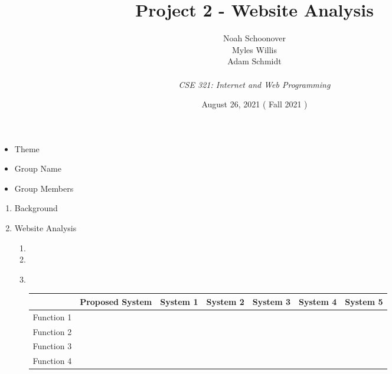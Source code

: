 \documentclass[12pt]{article}%
\def\assignmentName { Project 2 - Website Analysis                      }
\def\className      { CSE 321: Internet and Web Programming             }
\def\studentName    { Noah Schoonover \\ Myles Willis \\ Adam Schmidt   }
\def\studentEmail   {  }
\def\dueDate        { August 26, 2021                                   }
\def\semesterDate   { Fall 2021                                         }
\begin{document}


\begin{singlespace}
\title{ \assignmentName }
\author{ \studentName \\ {\small \studentEmail} \\ {\it \className}}
\date{\dueDate (\semesterDate)}
\maketitle
\end{singlespace}



\begin{itemize}
    \item Theme
    \item Group Name
    \item Group Members
\end{itemize}

\begin{enumerate}

    \item Background
    \item Website Analysis
        \begin{enumerate}
            \item 
            \item 
            \item \hspace{1cm} \\
            \begin{tabular}{|l|l|l|l|l|l|l|}
                \hline
                 & Proposed System & System 1 & System 2 & System 3 & System 4 & System 5 \\
                 \hline
                Function 1 & \\
                Function 2 & \\
                Function 3 & \\
                Function 4 & \\
                 \hline
            \end{tabular}
        \end{enumerate}

    
\end{enumerate}

\end{document}
